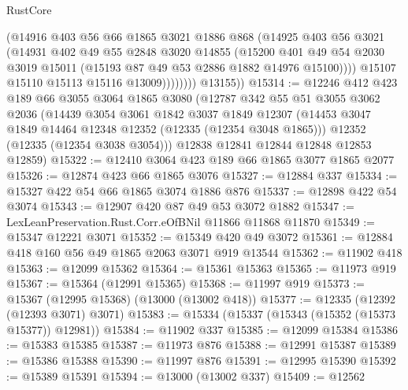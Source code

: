 \begin{lexlean}{RustCore}
\begin{coremodule}
                      (@14916
                        @403
                        @56
                        @66
                        @1865
                        @3021
                        @1886
                        @868
                        (@14925
                          @403
                          @56
                          @3021
                          (@14931
                            @402
                            @49
                            @55
                            @2848
                            @3020
                            @14855
                            (@15200
                              @401
                              @49
                              @54
                              @2030
                              @3019
                              @15011
                              (@15193 @87 @49 @53 @2886 @1882 @14976 @15100))))
                        @15107
                        @15110
                        @15113
                        @15116
                        @13009))))))))
        @13155))
@15314 := @12246
    @412
    @423
    @189
    @66
    @3055
    @3064
    @1865
    @3080
    (@12787
      @342
      @55
      @51
      @3055
      @3062
      @2036
      (@14439
        @3054
        @3061
        @1842
        @3037
        @1849
        @12307
        (@14453 @3047 @1849 @14464 @12348 @12352 (@12335 (@12354 @3048 @1865)))
        @12352
        (@12335 (@12354 @3038 @3054)))
      @12838
      @12841
      @12844
      @12848
      @12853
      @12859)
@15322 := @12410 @3064 @423 @189 @66 @1865 @3077 @1865 @2077
@15326 := @12874 @423 @66 @1865 @3076
@15327 := @12884 @337
@15334 := @15327 @422 @54 @66 @1865 @3074 @1886 @876
@15337 := @12898 @422 @54 @3074
@15343 := @12907 @420 @87 @49 @53 @3072 @1882
@15347 := LexLeanPreservation.Rust.Corr.eOfBNil @11866 @11868 @11870
@15349 := @15347 @12221 @3071
@15352 := @15349 @420 @49 @3072
@15361 := @12884 @418 @160 @56 @49 @1865 @2063 @3071 @919 @13544
@15362 := @11902 @418
@15363 := @12099 @15362
@15364 := @15361 @15363
@15365 := @11973 @919
@15367 := @15364 (@12991 @15365)
@15368 := @11997 @919
@15373 := @15367 (@12995 @15368) (@13000 (@13002 @418))
@15377 := @12335 (@12392 (@12393 @3071) @3071)
@15383 := @15334 (@15337 (@15343 (@15352 (@15373 @15377)) @12981))
@15384 := @11902 @337
@15385 := @12099 @15384
@15386 := @15383 @15385
@15387 := @11973 @876
@15388 := @12991 @15387
@15389 := @15386 @15388
@15390 := @11997 @876
@15391 := @12995 @15390
@15392 := @15389 @15391
@15394 := @13000 (@13002 @337)
@15409 := @12562

\end{coremodule}
\end{lexlean}
